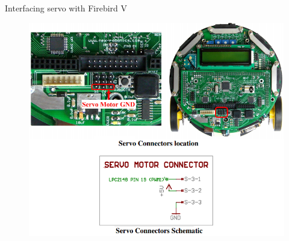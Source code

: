 \documentclass[table,10pt,red]{beamer}	%
\begin{document}
\begin{frame}{Interfacing servo with Firebird V}
	
	
	\begin{figure}
		\includegraphics[width=0.8\linewidth]{"lpc2148 servo connectors location"}
	\end{figure}
\end{frame}



\end{document}
